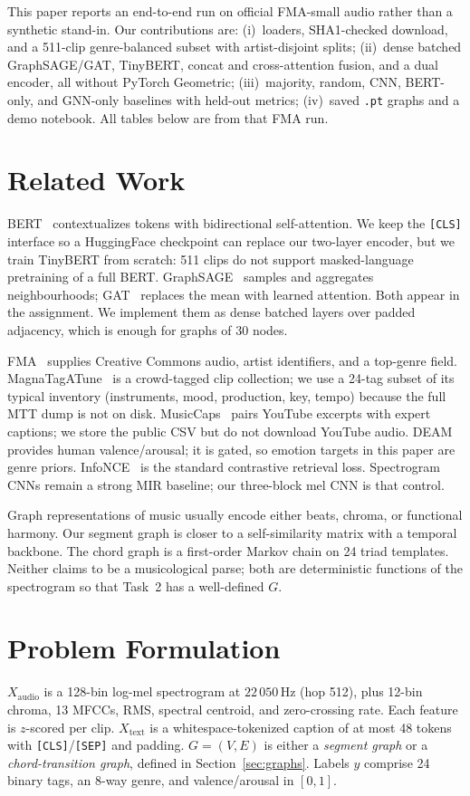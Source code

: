 \documentclass[conference]{IEEEtran}
\begin{document}
This paper reports an end-to-end run on official FMA-small audio rather than a synthetic stand-in. Our contributions are: (i)~loaders, SHA1-checked download, and a 511-clip genre-balanced subset with artist-disjoint splits; (ii)~dense batched GraphSAGE/GAT, TinyBERT, concat and cross-attention fusion, and a dual encoder, all without PyTorch Geometric; (iii)~majority, random, CNN, BERT-only, and GNN-only baselines with held-out metrics; (iv)~saved \texttt{.pt} graphs and a demo notebook. All tables below are from that FMA run.

\section{Related Work}
BERT~\cite{devlin2019} contextualizes tokens with bidirectional self-attention. We keep the \texttt{[CLS]} interface so a HuggingFace checkpoint can replace our two-layer encoder, but we train TinyBERT from scratch: 511 clips do not support masked-language pretraining of a full BERT. GraphSAGE~\cite{hamilton2017} samples and aggregates neighbourhoods; GAT~\cite{velickovic2018} replaces the mean with learned attention. Both appear in the assignment. We implement them as dense batched layers over padded adjacency, which is enough for graphs of 30 nodes.

FMA~\cite{defferrard2017} supplies Creative Commons audio, artist identifiers, and a top-genre field. MagnaTagATune~\cite{law2009} is a crowd-tagged clip collection; we use a 24-tag subset of its typical inventory (instruments, mood, production, key, tempo) because the full MTT dump is not on disk. MusicCaps~\cite{agostinelli2023} pairs YouTube excerpts with expert captions; we store the public CSV but do not download YouTube audio. DEAM~\cite{aljanaki2017} provides human valence/arousal; it is gated, so emotion targets in this paper are genre priors. InfoNCE~\cite{oord2018} is the standard contrastive retrieval loss. Spectrogram CNNs remain a strong MIR baseline; our three-block mel CNN is that control.

Graph representations of music usually encode either beats, chroma, or functional harmony. Our segment graph is closer to a self-similarity matrix with a temporal backbone. The chord graph is a first-order Markov chain on 24 triad templates. Neither claims to be a musicological parse; both are deterministic functions of the spectrogram so that Task~2 has a well-defined $G$.

\section{Problem Formulation}
$X_{\mathrm{audio}}$ is a 128-bin log-mel spectrogram at $22\,050$\,Hz (hop 512), plus 12-bin chroma, 13 MFCCs, RMS, spectral centroid, and zero-crossing rate. Each feature is $z$-scored per clip. $X_{\mathrm{text}}$ is a whitespace-tokenized caption of at most 48 tokens with \texttt{[CLS]}/\texttt{[SEP]} and padding. $G=(V,E)$ is either a \emph{segment graph} or a \emph{chord-transition graph}, defined in Section~\ref{sec:graphs}. Labels $y$ comprise 24 binary tags, an 8-way genre, and valence/arousal in $[0,1]$.
\end{document}
